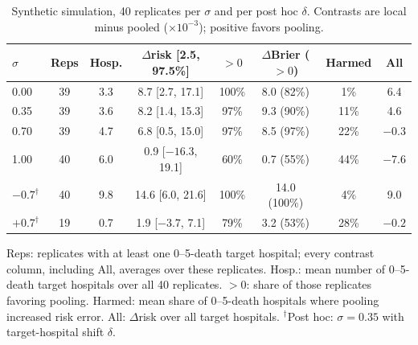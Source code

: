 \documentclass[11pt]{article}
\begin{document}
\begin{table}[p]
\caption{Synthetic simulation, 40 replicates per $\sigma$ and per post hoc $\delta$. Contrasts are local minus pooled ($\times10^{-3}$); positive favors pooling.}
\label{tab:sim}
\centering\footnotesize
\setlength{\tabcolsep}{2.2pt}
\begin{tabular}{@{}lccccccc@{}}
\toprule
$\sigma$ & Reps & Hosp. & $\Delta$risk [2.5, 97.5\%] & $>0$ & $\Delta$Brier ($>0$) & Harmed & All \\
\midrule
0.00 & 39 & 3.3 & 8.7 [2.7, 17.1] & 100\% & 8.0 (82\%) & 1\% & 6.4 \\
0.35 & 39 & 3.6 & 8.2 [1.4, 15.3] & 97\% & 9.3 (90\%) & 11\% & 4.6 \\
0.70 & 39 & 4.7 & 6.8 [0.5, 15.0] & 97\% & 8.5 (97\%) & 22\% & $-0.3$ \\
1.00 & 40 & 6.0 & 0.9 [$-16.3$, 19.1] & 60\% & 0.7 (55\%) & 44\% & $-7.6$ \\
\midrule
$-0.7^\dagger$ & 40 & 9.8 & 14.6 [6.0, 21.6] & 100\% & 14.0 (100\%) & 4\% & 9.0 \\
$+0.7^\dagger$ & 19 & 0.7 & 1.9 [$-3.7$, 7.1] & 79\% & 3.2 (53\%) & 28\% & $-0.2$ \\
\bottomrule
\end{tabular}

\vspace{2pt}
{\scriptsize Reps: replicates with at least one 0--5-death target hospital; every contrast column, including All, averages over these replicates. Hosp.: mean number of 0--5-death target hospitals over all 40 replicates. $>0$: share of those replicates favoring pooling. Harmed: mean share of 0--5-death hospitals where pooling increased risk error. All: $\Delta$risk over all target hospitals. $^\dagger$Post hoc: $\sigma=0.35$ with target-hospital shift $\delta$.}
\end{table}
\end{document}
